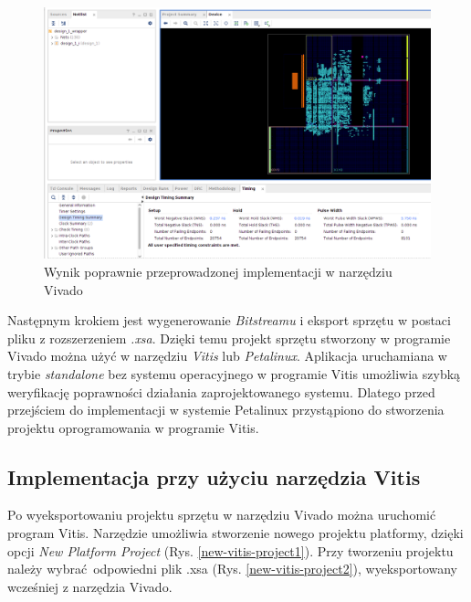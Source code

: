 \begin{figure}[!h]
  \centering
  \includegraphics[width=\textwidth]{img/impl-design-vivado.png}
  \caption{Wynik poprawnie przeprowadzonej implementacji w narzędziu Vivado}
  \label{impl_design_vivado}
\end{figure}

Następnym krokiem jest wygenerowanie \emph{Bitstreamu} i eksport sprzętu w postaci pliku z rozszerzeniem \emph{.xsa}.
Dzięki temu projekt sprzętu stworzony w programie Vivado można użyć w narzędziu \emph{Vitis} 
lub \emph{Petalinux}. Aplikacja uruchamiana w trybie \emph{standalone} bez systemu operacyjnego w programie Vitis 
umożliwia szybką weryfikację poprawności działania zaprojektowanego systemu. Dlatego przed przejściem do implementacji 
w systemie Petalinux przystąpiono do stworzenia projektu oprogramowania w programie Vitis.

\subsection{Implementacja przy użyciu narzędzia Vitis}

Po wyeksportowaniu projektu sprzętu w narzędziu Vivado można uruchomić program Vitis. Narzędzie umożliwia stworzenie 
nowego projektu platformy, dzięki opcji \emph{New Platform Project} (Rys. \ref{new-vitis-project1}). Przy tworzeniu 
projektu należy wybrać odpowiedni plik .xsa (Rys. \ref{new-vitis-project2}), wyeksportowany wcześniej z narzędzia 
Vivado. 

